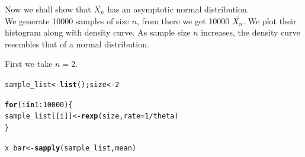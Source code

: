 \documentclass[11pt, a4paper]{article}\usepackage[]{graphicx}\usepackage[]{xcolor}
\makeatletter
\newcommand{\hlnum}[1]{\textcolor[rgb]{0.686,0.059,0.569}{#1}}%
\newcommand{\hlopt}[1]{\textcolor[rgb]{0,0,0}{#1}}%
\newcommand{\hldef}[1]{\textcolor[rgb]{0.345,0.345,0.345}{#1}}%
\newcommand{\hlkwa}[1]{\textcolor[rgb]{0.161,0.373,0.58}{\textbf{#1}}}%
\newcommand{\hlkwb}[1]{\textcolor[rgb]{0.69,0.353,0.396}{#1}}%
\newcommand{\hlkwc}[1]{\textcolor[rgb]{0.333,0.667,0.333}{#1}}%
\newcommand{\hlkwd}[1]{\textcolor[rgb]{0.737,0.353,0.396}{\textbf{#1}}}%
\newenvironment{kframe}{%
 \def\at@end@of@kframe{}%
 \ifinner\ifhmode%
  \def\at@end@of@kframe{\end{minipage}}%
  \begin{minipage}{\columnwidth}%
 \fi\fi%
 \def\FrameCommand##1{\hskip\@totalleftmargin \hskip-\fboxsep
 \colorbox{shadecolor}{##1}\hskip-\fboxsep
     \hskip-\linewidth \hskip-\@totalleftmargin \hskip\columnwidth}%
 \MakeFramed {\advance\hsize-\width
   \@totalleftmargin\z@ \linewidth\hsize
   \@setminipage}}%
 {\par\unskip\endMakeFramed%
 \at@end@of@kframe}
\newenvironment{knitrout}{}{} %
\makeatother
\begin{document}
\leftpointright \hspace{0.5cm} Now we shall show that $\bar{X_n}$ has an asymptotic normal distribution. \\

We generate 10000 samples of size $n$, from there we get 10000 $\bar{X_n}$. We plot their histogram along with density curve. As sample size $n$ increases, the density curve resembles that of a normal distribution.

\newpage

First we take $n = 2$.

\begin{knitrout}
\color{fgcolor}\begin{kframe}
\begin{alltt}
\hldef{sample_list} \hlkwb{<-} \hlkwd{list}\hldef{(); size} \hlkwb{<-} \hlnum{2}

\hlkwa{for}\hldef{(i} \hlkwa{in} \hlnum{1}\hlopt{:}\hlnum{10000}\hldef{)\{}
  \hldef{sample_list[[i]]} \hlkwb{<-} \hlkwd{rexp}\hldef{(size,} \hlkwc{rate} \hldef{=} \hlnum{1} \hlopt{/} \hldef{theta)}
\hldef{\}}

\hldef{x_bar} \hlkwb{<-} \hlkwd{sapply}\hldef{(sample_list, mean)}
\end{alltt}
\end{kframe}
\end{knitrout}
\end{document}
